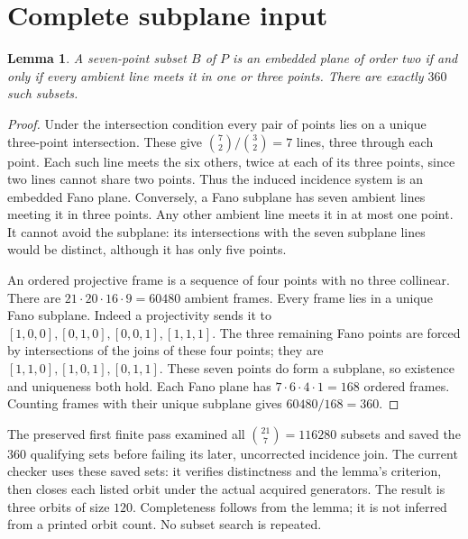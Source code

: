 \documentclass[11pt]{article}
\newtheorem{lemma}{Lemma}\newtheorem{theorem}{Theorem}
\begin{document}
\section{Complete subplane input}
\begin{lemma}
A seven-point subset $B$ of $P$ is an embedded plane of order two if
and only if every ambient line meets it in one or three points.
There are exactly $360$ such subsets.
\end{lemma}
\begin{proof}
Under the intersection condition every pair of points lies on a unique
three-point intersection. These give $\binom72/\binom32=7$ lines,
three through each point. Each such line meets the six others, twice
at each of its three points, since two lines cannot share two points.
Thus the induced incidence system is an embedded Fano plane.
Conversely, a Fano subplane has seven ambient lines meeting it in three
points. Any other ambient line meets it in at most one point. It cannot
avoid the subplane: its intersections with the seven subplane lines
would be distinct, although it has only five points.

An ordered projective frame is a sequence of four points with no three
collinear. There are $21\cdot20\cdot16\cdot9=60480$ ambient frames.
Every frame lies in a unique Fano subplane. Indeed a projectivity sends
it to $[1,0,0],[0,1,0],[0,0,1],[1,1,1]$. The three remaining Fano points
are forced by intersections of the joins of these four points; they
are $[1,1,0],[1,0,1],[0,1,1]$. These seven points do form a subplane,
so existence and uniqueness both hold. Each Fano plane has
$7\cdot6\cdot4\cdot1=168$ ordered frames. Counting frames with their
unique subplane gives $60480/168=360$.
\end{proof}
The preserved first finite pass examined all $\binom{21}{7}=116280$
subsets and saved the $360$ qualifying sets before failing its later,
uncorrected incidence join. The current checker uses these saved sets:
it verifies distinctness and the lemma's criterion, then closes each
listed orbit under the actual acquired generators. The result is three
orbits of size $120$. Completeness follows from the lemma; it is not
inferred from a printed orbit count. No subset search is repeated.
\end{document}
